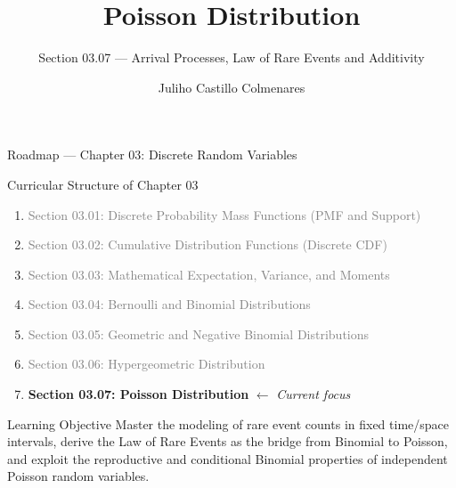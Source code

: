 \documentclass[aspectratio=169,xcolor={dvipsnames,table}]{beamer}
\title{Poisson Distribution}
\subtitle{Section 03.07 --- Arrival Processes, Law of Rare Events and Additivity}
\author[J. Castillo Colmenares]{Juliho Castillo Colmenares}
\institute[Tec de Monterrey]{Tecnologico de Monterrey}
\date{\vspace{-1.5cm}}
\begin{document}
\begin{frame}[plain]
	\titlepage
\end{frame}

\begin{frame}{Roadmap --- Chapter 03: Discrete Random Variables}
	\vspace{-0.15cm}
	\begin{block}{Curricular Structure of Chapter 03}
		\footnotesize
		\begin{enumerate}\itemsep=0.03cm
			\item \textcolor{gray}{Section 03.01: Discrete Probability Mass Functions (PMF and Support)}
			\item \textcolor{gray}{Section 03.02: Cumulative Distribution Functions (Discrete CDF)}
			\item \textcolor{gray}{Section 03.03: Mathematical Expectation, Variance, and Moments}
			\item \textcolor{gray}{Section 03.04: Bernoulli and Binomial Distributions}
			\item \textcolor{gray}{Section 03.05: Geometric and Negative Binomial Distributions}
			\item \textcolor{gray}{Section 03.06: Hypergeometric Distribution}
			\item \textbf{\textcolor{TecRojo}{Section 03.07: Poisson Distribution}} $\leftarrow$ \emph{Current focus}
		\end{enumerate}
	\end{block}
	\vspace{-0.2cm}
	\begin{alertblock}{Learning Objective}
		\scriptsize
		Master the modeling of rare event counts in fixed time/space intervals, derive the Law of Rare Events as the bridge from Binomial to Poisson, and exploit the reproductive and conditional Binomial properties of independent Poisson random variables.
	\end{alertblock}
\end{frame}
\end{document}
